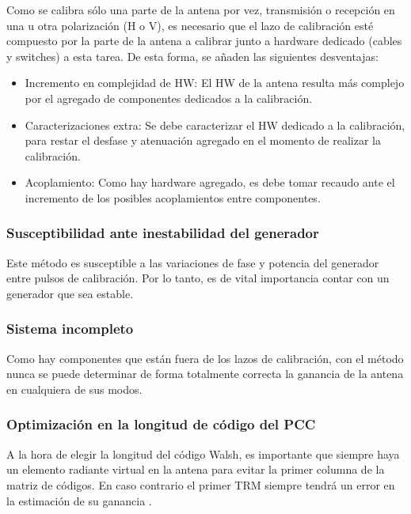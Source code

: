 Como se calibra sólo una parte de la antena por vez, transmisión o recepción en una u otra polarización (H o V), es necesario
que el lazo de calibración esté compuesto por la parte de la antena a calibrar junto a hardware dedicado (cables y switches) a
esta tarea. De esta forma, se añaden las siguientes desventajas:

\begin{itemize}
	\item Incremento en complejidad de HW: El HW de la antena resulta más complejo por el agregado de componentes dedicados a la
		calibración.
	\item Caracterizaciones extra: Se debe caracterizar el HW dedicado a la calibración, para restar el desfase y atenuación
		agregado en el momento de realizar la calibración.
	\item Acoplamiento: Como hay hardware agregado, es debe tomar recaudo ante el incremento de los posibles acoplamientos entre
		componentes.	
\end{itemize}


\subsubsection{Susceptibilidad ante inestabilidad del generador}

Este método es susceptible a las variaciones de fase y potencia del generador entre pulsos de calibración. Por lo tanto, es de
vital importancia contar con un generador que sea estable.


\subsubsection{Sistema incompleto}

Como hay componentes que están fuera de los lazos de calibración, con el método nunca se puede determinar de forma totalmente
correcta la ganancia de la antena en cualquiera de sus modos.


\subsubsection{Optimización en la longitud de código del PCC}

A la hora de elegir la longitud del código Walsh, es importante que siempre haya un elemento radiante virtual en la antena para
evitar la primer columna de la matriz de códigos. En caso contrario el primer TRM siempre tendrá un error en la estimación de
su ganancia \cite{Wang2010}.



